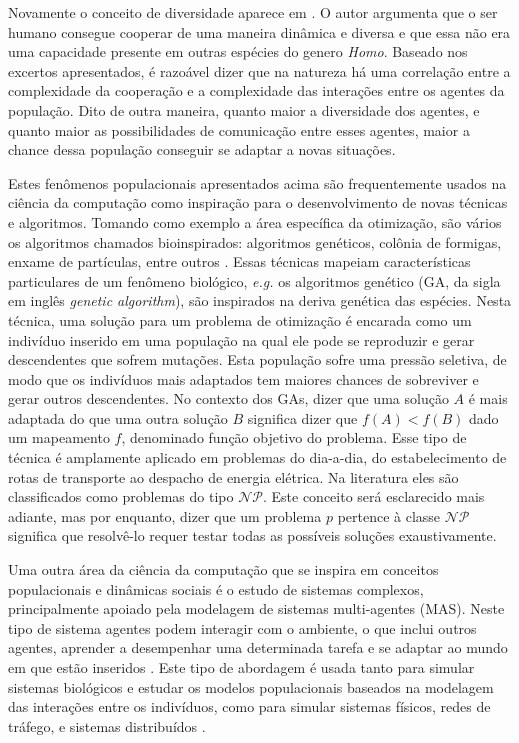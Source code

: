 Novamente o conceito de diversidade aparece em . O autor argumenta que o ser humano consegue cooperar de uma maneira dinâmica e diversa e que essa não era uma capacidade presente em outras espécies do genero \textit{Homo}. Baseado nos excertos apresentados, é razoável dizer que na natureza há uma correlação entre a complexidade da cooperação e a complexidade das interações entre os agentes da população. Dito de outra maneira, quanto maior a diversidade dos agentes, e quanto maior as possibilidades de comunicação entre esses agentes, maior a chance dessa população conseguir se adaptar a novas situações. 

Estes fenômenos populacionais apresentados acima são frequentemente usados na ciência da computação como inspiração para o desenvolvimento de novas técnicas e algoritmos. Tomando como exemplo a área específica da otimização, são vários os algoritmos chamados bioinspirados: algoritmos genéticos, colônia de formigas, enxame de partículas, entre outros \cite{binitha2012}. Essas técnicas mapeiam características particulares de um fenômeno biológico, \textit{e.g.} os algoritmos genético (GA, da sigla em inglês \textit{genetic algorithm}), são inspirados na deriva genética das espécies. Nesta técnica, uma solução para um problema de otimização é encarada como um indivíduo inserido em  uma população na qual ele pode se reproduzir e gerar descendentes que sofrem mutações. Esta população sofre uma pressão seletiva, de modo que os indivíduos mais adaptados tem maiores chances de sobreviver e gerar outros descendentes. No contexto dos GAs, dizer que uma solução $A$ é mais adaptada do que uma outra solução $B$ significa dizer que $f(A) < f(B)$ dado um mapeamento $f$, denominado função objetivo do problema. Esse tipo de técnica é amplamente aplicado em problemas do dia-a-dia, do estabelecimento de rotas de transporte ao despacho de energia elétrica. Na literatura eles são classificados como problemas do tipo $\mathcal{NP}$. Este conceito será esclarecido mais adiante, mas por enquanto, dizer que um problema $p$ pertence à classe $\mathcal{NP}$ significa que resolvê-lo requer testar todas as possíveis soluções exaustivamente.

Uma outra área da ciência da computação que se inspira em conceitos populacionais e dinâmicas sociais é o estudo de sistemas complexos, principalmente apoiado pela modelagem de sistemas multi-agentes (MAS). Neste tipo de sistema agentes podem interagir com o ambiente, o que inclui outros agentes, aprender a desempenhar uma determinada tarefa e se adaptar ao mundo em que estão inseridos \cite{holland2014}. Este tipo de abordagem é usada tanto para simular sistemas biológicos e estudar os modelos populacionais baseados na modelagem das interações entre os indivíduos, como para simular sistemas físicos, redes de tráfego, e sistemas distribuídos . 

